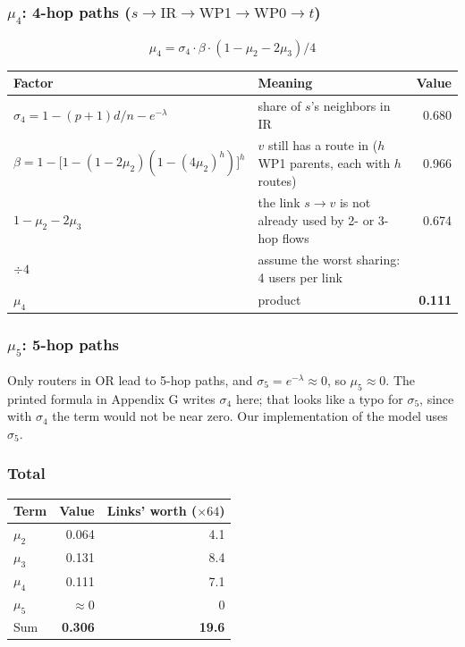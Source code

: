 \subsubsection*{$\mu_4$: 4-hop paths ($s \to \text{IR} \to \text{WP1} \to \text{WP0} \to t$)}

\[
\mu_4 = \sigma_4 \cdot \beta \cdot (1 - \mu_2 - 2\mu_3) / 4
\]

\begin{center}
\begin{tabularx}{\linewidth}{@{}l L r@{}}
\toprule
Factor & Meaning & Value \\
\midrule
$\sigma_4 = 1 - (p+1)d/n - e^{-\lambda}$ & share of $s$'s neighbors in IR & 0.680 \\
$\beta = 1 - \big[1 - (1 - 2\mu_2)(1 - (4\mu_2)^h)\big]^h$ & $v$ still has a route in ($h$ WP1 parents, each with $h$ routes) & 0.966 \\
$1 - \mu_2 - 2\mu_3$ & the link $s \to v$ is not already used by 2- or 3-hop flows & 0.674 \\
$\div 4$ & assume the worst sharing: 4 users per link & \\
$\mu_4$ & product & \textbf{0.111} \\
\bottomrule
\end{tabularx}
\end{center}

\subsubsection*{$\mu_5$: 5-hop paths}

Only routers in OR lead to 5-hop paths, and $\sigma_5 = e^{-\lambda} \approx 0$, so $\mu_5 \approx 0$. The printed formula in Appendix G writes $\sigma_4$ here; that looks like a typo for $\sigma_5$, since with $\sigma_4$ the term would not be near zero. Our implementation of the model uses $\sigma_5$.

\subsubsection*{Total}

\begin{center}
\begin{tabular}{@{}lrr@{}}
\toprule
Term & Value & Links' worth ($\times 64$) \\
\midrule
$\mu_2$ & 0.064 & 4.1 \\
$\mu_3$ & 0.131 & 8.4 \\
$\mu_4$ & 0.111 & 7.1 \\
$\mu_5$ & $\approx 0$ & 0 \\
\midrule
Sum & \textbf{0.306} & \textbf{19.6} \\
\bottomrule
\end{tabular}
\end{center}

